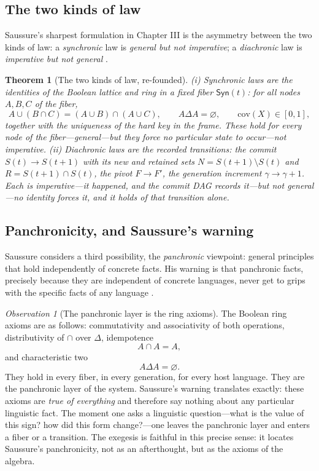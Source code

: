 \documentclass[11pt,a4paper]{article}
\newtheorem{theorem}[principle]{Theorem}
\theoremstyle{remark}
\newtheorem{observation}[principle]{Observation}
\newcommand{\xor}{\ensuremath{\Delta}}                   %
\newcommand{\Cov}{\ensuremath{\mathrm{cov}}}             %
\newcommand{\Sync}{\ensuremath{\mathsf{Syn}}}            %
\newcommand{\Gen}{\ensuremath{\gamma}}                   %
\begin{document}
\subsection{The two kinds of law}
\label{sec:laws}

Saussure's sharpest formulation in Chapter III is the asymmetry between the two
kinds of law: a \emph{synchronic} law is \emph{general but not imperative}; a
\emph{diachronic} law is \emph{imperative but not general}
\cite[Part I, ch.~III, \S3]{harris1983}.

\begin{theorem}[The two kinds of law, re-founded]
\label{thm:laws}
(i) \emph{Synchronic laws} are the identities of the Boolean lattice and ring
in a fixed fiber $\Sync(t)$: for all nodes $A,B,C$ of the fiber,
\[
  A \cup (B \cap C) = (A \cup B) \cap (A \cup C),
  \qquad
  A \xor A = \varnothing,
  \qquad
  \Cov(X) \in [0,1],
\]
together with the uniqueness of the hard key in the frame. These hold for
\emph{every} node of the fiber---general---but they force no particular state
to occur---not imperative.
(ii) \emph{Diachronic laws} are the recorded transitions: the commit
$S(t) \to S(t+1)$ with its new and retained sets
$N = S(t{+}1) \setminus S(t)$ and $R = S(t{+}1) \cap S(t)$, the pivot
$F \to F'$, the generation increment $\Gen \to \Gen+1$. Each is
\emph{imperative}---it happened, and the commit DAG records it---but
\emph{not general}---no identity forces it, and it holds of that transition
alone.
\end{theorem}

\subsection{Panchronicity, and Saussure's warning}
\label{sec:panchrony}

Saussure considers a third possibility, the \emph{panchronic} viewpoint:
general principles that hold independently of concrete facts. His warning is
that panchronic facts, precisely because they are independent of concrete
languages, never get to grips with the specific facts of any language
\cite[Part I, ch.~III, \S4]{harris1983}.

\begin{observation}[The panchronic layer is the ring axioms]
\label{obs:panchronic}
The Boolean ring axioms are as follows: commutativity and associativity of
both operations, distributivity of $\cap$ over $\xor$, idempotence
\[
  A \cap A = A,
\]
and characteristic two
\[
  A \xor A = \varnothing.
\]
They hold in every fiber, in every generation, for every host
language. They are the panchronic layer of the system. Saussure's warning
translates exactly: these axioms are \emph{true of everything} and therefore
say nothing about any particular linguistic fact. The moment one asks a
linguistic question---what is the value of this sign? how did this form
change?---one leaves the panchronic layer and enters a fiber or a transition.
The exegesis is faithful in this precise sense: it locates Saussure's
panchronicity, not as an afterthought, but as the axioms of the algebra.
\end{observation}
\end{document}
